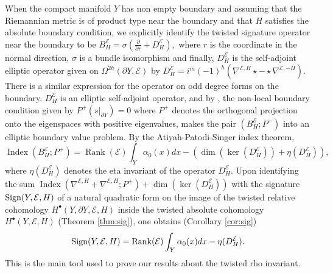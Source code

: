 \documentclass[12pt]{amsart}
\theoremstyle{plain}
\theoremstyle{definition}
\theoremstyle{remark}
\begin{document}
{{When the compact manifold $Y$ has non empty boundary and }}assuming that the 
Riemannian metric is of product type near the boundary {{and that $H$ satisfies the absolute boundary condition}}, we explicitly identify 
the twisted signature operator near the boundary
to be 
$B^{\mathcal E}_H = \sigma\left(\frac{\partial}{\partial r} + D^{\mathcal E}_H \right),$ where 
$r$ is the coordinate in the normal direction, $\sigma$ is a bundle isomorphism and 
finally,  {{$D^{\mathcal E}_H$ is }} the self-adjoint elliptic operator  given on $\Omega^{2h}(\partial Y, {\mathcal E})$ by
${{D^{\mathcal E}_H = i^m (-1)^{h} (\nabla^{{\mathcal E}, H} \star -  \star \nabla^{{\mathcal E}, -\overline H})}}$. 
There is a similar expression for the operator 
on odd degree forms on the boundary. $D^{\mathcal E}_H$ is an elliptic self-adjoint operator, and 
by \cite{APS3}, the non-local boundary condition given by $P^+(s\big|_{\partial Y})=0$
where $P^+$ denotes the orthogonal projection onto the eigenspaces with positive eigenvalues,
makes the pair $(B^{\mathcal E}_H; P^+)$
into an elliptic boundary value problem. By the Atiyah-Patodi-Singer index theorem,
$$
{\operatorname{Index}}(B^{\mathcal E}_H; P^+) =  {{{\operatorname{Rank}} ({\mathcal E}) }}\int_Y \alpha_0(x) dx - \left(\dim(\ker(D^{\mathcal E}_H))
+\eta(D^{\mathcal E}_H)\right),
$$
where $\eta(D^{\mathcal E}_H)$ denotes the eta invariant of the operator $D^{\mathcal E}_H$. Upon identifying the sum
${\operatorname{Index}}(\nabla^{{\mathcal E}, H} + \nabla^{{\mathcal E}, H}; P^+) + \dim(\ker(D^{\mathcal E}_H))$ with the signature ${\rm Sign}(Y, {\mathcal E}, H)$ of a natural 
quadratic form on the image 
of the twisted relative cohomology $H^\bullet(Y, \partial Y, {\mathcal E}, H)$ inside the twisted absolute 
cohomology $H^\bullet(Y,  {\mathcal E}, H)$ (Theorem \ref{thm:sig}), one obtains (Corollary \ref{cor:sig})
\begin{equation}\label{sign-thm}
{\rm Sign}(Y, {\mathcal E}, H)= {{{\operatorname{Rank}} ({\mathcal E}) }}\int_Y \alpha_0(x) dx - \eta(D^{\mathcal E}_H).
\end{equation}
This is the main tool used to prove our results about the twisted rho invariant.
\end{document}
